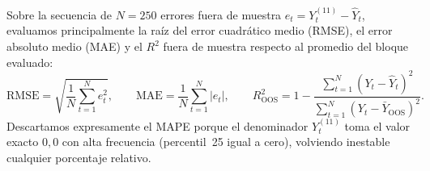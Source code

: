 \documentclass[12pt,letterpaper]{article}
\begin{document}
Sobre la secuencia de \(N = 250\) errores fuera de muestra \(e_t = Y_t^{(11)} - \widehat{Y}_t\), evaluamos principalmente la raíz del error cuadrático medio (RMSE), el error absoluto medio (MAE) y el \(R^2\) fuera de muestra respecto al promedio del bloque evaluado:
\begin{equation}
  \text{RMSE} = \sqrt{\frac{1}{N}\sum_{t=1}^{N} e_t^2}, \qquad \text{MAE} = \frac{1}{N}\sum_{t=1}^{N} \lvert e_t \rvert, \qquad R^2_{\text{OOS}} = 1 - \frac{\sum_{t=1}^{N}(Y_t - \widehat{Y}_t)^2}{\sum_{t=1}^{N}(Y_t - \bar{Y}_{\text{OOS}})^2}.
  \label{eq:rmse_r2}
\end{equation}
Descartamos expresamente el MAPE porque el denominador \(Y_t^{(11)}\) toma el valor exacto \(0{,}0\) con alta frecuencia (percentil~25 igual a cero), volviendo inestable cualquier porcentaje relativo.
\end{document}
